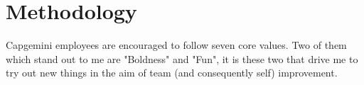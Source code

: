 \section{Methodology}
Capgemini employees are encouraged to follow seven core values. Two of them
which stand out to me are "Boldness" and "Fun", it is these two that
drive me to try out new things in the aim of team (and consequently self)
improvement.

